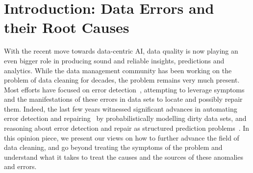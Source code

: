 \documentclass[11pt]{article}
\begin{document}




%
\section{Introduction: Data Errors and their Root Causes}
\label{sec:intro}

With the recent move towards data-centric AI, data quality is now playing an even bigger role in producing sound and reliable insights, predictions and analytics. While the data management community has been working on the problem of data cleaning for decades, the problem remains very much present. Most efforts have focused on error detection~\cite{DBLP:books/acm/IlyasC19}, attempting to leverage symptoms and the manifestations of these errors in data sets to locate and possibly repair them. 
Indeed, the last few years witnessed significant advances in automating error detection and repairing~\cite{holoclean,holodetect,raha,yeye-unidetect} by probabilistically modelling dirty data sets, and reasoning about error detection and repair as structured prediction problems~\cite{puds,uai_heidari}. In this opinion piece, we present our views on how to further advance the field of data cleaning, and go beyond treating the symptoms of the problem and understand what it takes to treat the causes and the sources of these anomalies and errors.
\end{document}

